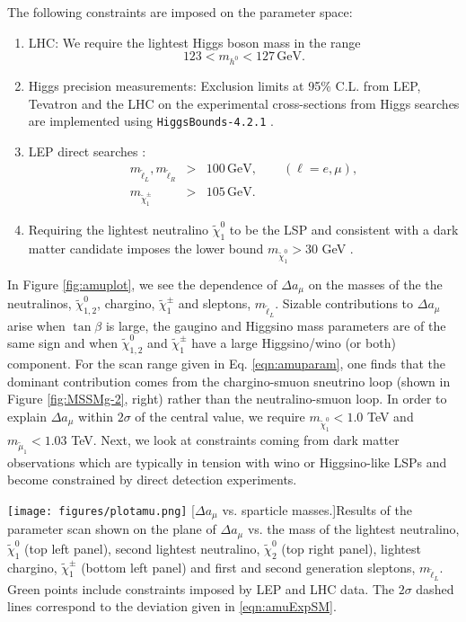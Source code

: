 The following constraints are imposed on the parameter space:
\begin{enumerate}[label=\roman*.]
\item LHC: We require the lightest Higgs boson mass in the range
\begin{equation}
123 < m_{h^0} < 127\,\text{GeV}.
\end{equation}
\item Higgs precision measurements: Exclusion limits at 95\% C.L. from LEP, Tevatron and the LHC on the experimental cross-sections from Higgs searches are implemented using \texttt{HiggsBounds-4.2.1} \cite{RN170,RN169,RN624,RN312}.
\item LEP direct searches \cite{RN493}:
\begin{eqnarray}
m_{\tilde{\ell}_L},m_{\tilde{\ell}_R} &>& 100\,\text{GeV}, \qquad (\ell=e,\mu), \\
m_{\tilde{\chi}^{\pm}_1} &>& 105\,\text{GeV}.
\end{eqnarray}
\item Requiring the lightest neutralino $\tilde{\chi}^0_1$ to be the LSP and consistent with a dark matter candidate imposes the lower bound $m_{\tilde{\chi}^0_1}>30$ GeV \cite{RN232,RN775}.
\end{enumerate}

In Figure \ref{fig:amuplot}, we see the dependence of $\Delta a_{\mu}$ on the masses of the the neutralinos, $\tilde{\chi}^0_{1,2}$, chargino, $\tilde{\chi}^{\pm}_1$ and sleptons, $m_{\tilde{\ell}_L}$. Sizable contributions to $\Delta a_{\mu}$ arise when $\tan \beta$ is large, the gaugino and Higgsino mass parameters are of the same sign and when $\tilde{\chi}^0_{1,2}$ and $\tilde{\chi}^{\pm}_1$ have a large Higgsino/wino (or both) component. For the scan range given in Eq. \ref{eqn:amuparam}, one finds that the dominant contribution comes from the chargino-smuon sneutrino loop (shown in Figure \ref{fig:MSSMg-2}, right) rather than the neutralino-smuon loop. In order to explain $\Delta a_{\mu}$ within $2\sigma$ of the central value, we require $m_{\tilde{\chi}^0_1} < 1.0$ TeV and $m_{\tilde{\mu}_1} < 1.03$ TeV. Next, we look at constraints coming from dark matter observations which are typically in tension with wino or Higgsino-like LSPs and become constrained by direct detection experiments.

\begin{center}
	\texttt{[image: figures/plotamu.png]}
	[$\Delta a_{\mu}$ vs. sparticle masses.]{Results of the parameter scan shown on the plane of $\Delta a_{\mu}$ vs. the mass of the lightest neutralino, $\tilde{\chi}^0_1$ (top left panel), second lightest neutralino, $\tilde{\chi}^0_2$ (top right panel), lightest chargino, $\tilde{\chi}^{\pm}_1$ (bottom left panel) and first and second generation sleptons, $m_{\tilde{\ell}_L}$. Green points include constraints imposed by LEP and LHC data. The $2 \sigma$ dashed lines correspond to the deviation given in \ref{eqn:amuExpSM}.}
	\label{fig:amuplot}
\end{center}

